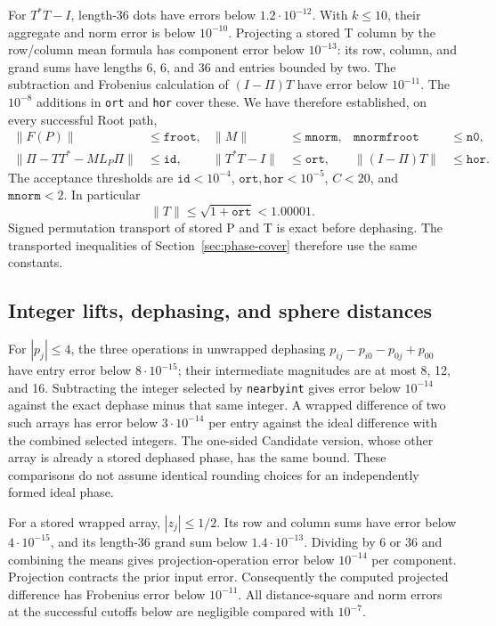 For $T^*T-I$, length-36 dots have errors below
$1.2\cdot10^{-12}$.  With $k\le10$, their aggregate and norm error
is below $10^{-10}$.  Projecting a stored T column by the row/column
mean formula has component error below $10^{-13}$: its row, column,
and grand sums have lengths 6, 6, and 36 and entries bounded by two.
The subtraction and Frobenius calculation of
$(I-\Pi)T$ have error below $10^{-11}$.
The $10^{-8}$ additions in \texttt{ort} and \texttt{hor} cover these.
We have therefore established, on every successful Root path,
\begin{align}
 \|F(P)\|&\le\mathtt{froot},&
 \|M\|&\le\mathtt{mnorm},&
 \mathtt{mnorm}\mathtt{froot}&\le\mathtt{n0},\nonumber\\
 \|\Pi-TT^*-ML_P\Pi\|&\le\mathtt{id},&
 \|T^*T-I\|&\le\mathtt{ort},&
 \|(I-\Pi)T\|&\le\mathtt{hor}.\label{round:root-invariants}
\end{align}
The acceptance thresholds are
$\mathtt{id}<10^{-4}$,
$\mathtt{ort},\mathtt{hor}<10^{-5}$, $C<20$, and
$\mathtt{mnorm}<2$.  In particular
\begin{equation}\label{round:t-operator}
 \|T\|\le\sqrt{1+\mathtt{ort}}<1.00001.
\end{equation}
Signed permutation transport of stored P and T is exact before
dephasing.  The transported inequalities of
Section~\ref{sec:phase-cover} therefore use the same constants.

\subsection{Integer lifts, dephasing, and sphere distances}
\label{round:dephasing}

For $|p_j|\le4$, the three operations in unwrapped dephasing
$p_{ij}-p_{i0}-p_{0j}+p_{00}$ have entry error below
$8\cdot10^{-15}$; their intermediate magnitudes are at most 8, 12,
and 16.  Subtracting the integer selected by \texttt{nearbyint}
gives error below $10^{-14}$ against the exact dephase minus that
same integer.  A wrapped difference of two such arrays has error
below $3\cdot10^{-14}$ per entry against the ideal difference with
the combined selected integers.  The one-sided Candidate version,
whose other array is already a stored dephased phase, has the same
bound.  These comparisons do not assume identical rounding choices
for an independently formed ideal phase.

For a stored wrapped array, $|z_j|\le1/2$.  Its row and column sums
have error below $4\cdot10^{-15}$, and its length-36 grand sum below
$1.4\cdot10^{-13}$.  Dividing by 6 or 36 and combining the means
gives projection-operation error below $10^{-14}$ per component.
Projection contracts the prior input error.  Consequently the
computed projected difference has Frobenius error below $10^{-11}$.
All distance-square and norm errors at the successful cutoffs below
are negligible compared with $10^{-7}$.

